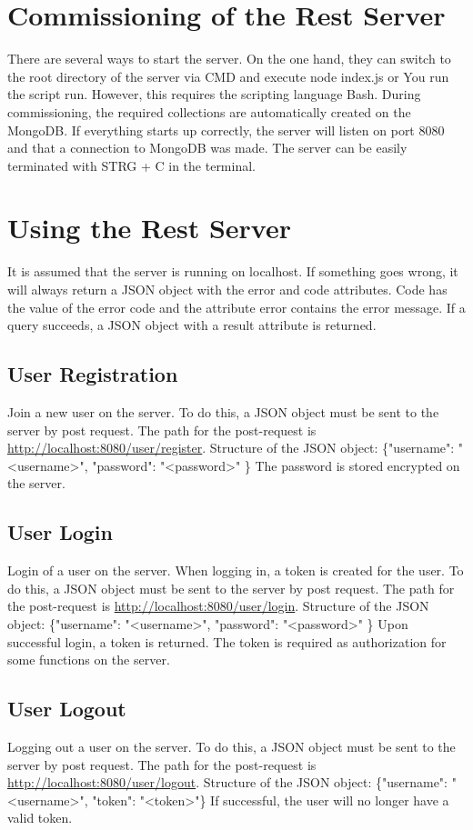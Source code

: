 \documentclass[12pt]{scrartcl}
\begin{document}
    \section{Commissioning of the Rest Server}
        There are several ways to start the server.
        On the one hand, they can switch to the root directory of the server via CMD and execute node index.js or
        You run the script run. However, this requires the scripting language Bash.
        During commissioning, the required collections are automatically created on the MongoDB.
        If everything starts up correctly, the server will listen on port 8080
        and that a connection to MongoDB was made.
        The server can be easily terminated with STRG + C in the terminal.
    \section{Using the Rest Server}
        It is assumed that the server is running on localhost.
        If something goes wrong, it will always return a JSON object with the error and code attributes.
        Code has the value of the error code and the attribute error contains the error message.
        If a query succeeds, a JSON object with a result attribute is returned.
    \subsection{User Registration}
        Join a new user on the server.
        To do this, a JSON object must be sent to the server by post request. The path for the post-request is
        \url{http://localhost:8080/user/register}.
        Structure of the JSON object: \{"username": "<username>", "password": "<password>" \}
        The password is stored encrypted on the server.

    \subsection{User Login}
        Login of a user on the server. When logging in, a token is created for the user.
        To do this, a JSON object must be sent to the server by post request. The path for the post-request is
        \url{http://localhost:8080/user/login}.
        Structure of the JSON object: \{"username": "<username>", "password": "<password>" \}
        Upon successful login, a token is returned. The token is required as authorization for some functions on the server.
    
    \subsection{User Logout}
        Logging out a user on the server.
        To do this, a JSON object must be sent to the server by post request. The path for the post-request is
        \url{http://localhost:8080/user/logout}.
        Structure of the JSON object: \{"username": "<username>", "token": "<token>"\}
        If successful, the user will no longer have a valid token.
\end{document}
